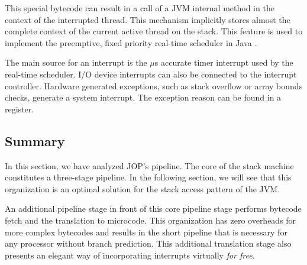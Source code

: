This special bytecode can result in a call of a JVM internal method
in the context of the interrupted thread. This mechanism implicitly
stores almost the complete context of the current active thread on
the stack. This feature is used to implement the preemptive, fixed
priority real-time scheduler in Java \cite{jop:javasched}.

The main source for an interrupt is the $\mu$s accurate timer
interrupt used by the real-time scheduler. I/O device interrupts can
also be connected to the interrupt controller. Hardware generated
exceptions, such as stack overflow or array bounds checks, generate a
system interrupt. The exception reason can be found in a register.

\subsection{Summary}

In this section, we have analyzed JOP's pipeline. The core of the
stack machine constitutes a three-stage pipeline. In the following
section, we will see that this organization is an optimal solution
for the stack access pattern of the JVM.

An additional pipeline stage in front of this core pipeline stage
performs bytecode fetch and the translation to microcode. This
organization has zero overheads for more complex bytecodes and
results in the short pipeline that is necessary for any processor
without branch prediction. This additional translation stage also
presents an elegant way of incorporating interrupts virtually
\emph{for free}.
